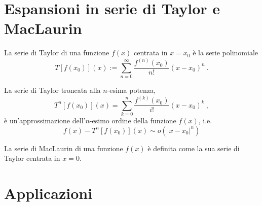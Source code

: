\section{Espansioni in serie di Taylor e MacLaurin}\label{ch:taylor}
\begin{definition} La serie di Taylor di una funzione $f(x)$ centrata in $x=x_0$ è la serie polinomiale
\begin{equation}
   T[f(x_0)](x) := \sum_{n=0}^{\infty} \dfrac{f^{(n)}(x_0)}{n!} (x-x_0)^n \ .
\end{equation}
\end{definition}
%
\begin{theorem}
La serie di Taylor troncata alla $n$-esima potenza,
\begin{equation}
  T^n[f(x_0)](x) = \sum_{k=0}^{n} \dfrac{f^{(k)}(x_0)}{i!} (x-x_0)^k \ ,
\end{equation}
è un'approssimazione dell'$n$-esimo ordine della funzione $f(x)$, i.e.
\begin{equation}
  f(x) - T^n[f(x_0)](x) \sim o(|x-x_0|^{n})
\end{equation}
\end{theorem}

\begin{definition} La serie di MacLaurin di una funzione $f(x)$ è definita come la sua serie di Taylor centrata in $x=0$.
\end{definition}


\section{Applicazioni}

